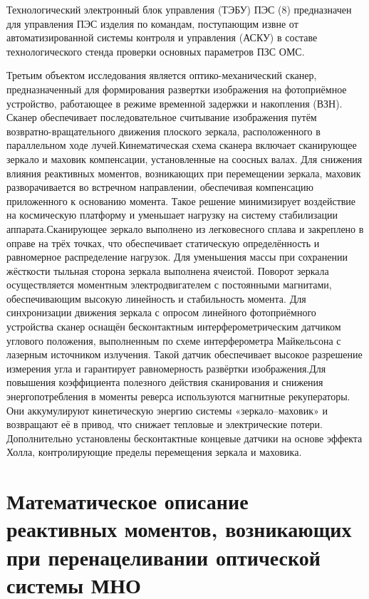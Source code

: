 Технологический электронный блок управления (ТЭБУ) ПЭС (8) предназначен для управления ПЭС изделия по командам, поступающим извне от автоматизированной системы контроля и управления (АСКУ) в составе технологического стенда проверки основных параметров ПЗС ОМС.

Третьим объектом исследования является оптико-механический сканер, предназначенный для формирования развертки изображения на фотоприёмное устройство, работающее в режиме временной задержки и накопления (ВЗН). Сканер обеспечивает последовательное считывание изображения путём возвратно-вращательного движения плоского зеркала, расположенного в параллельном ходе лучей.Кинематическая схема сканера включает сканирующее зеркало и маховик компенсации, установленные на соосных валах. Для снижения влияния реактивных моментов, возникающих при перемещении зеркала, маховик разворачивается во встречном направлении, обеспечивая компенсацию приложенного к основанию момента. Такое решение минимизирует воздействие на космическую платформу и уменьшает нагрузку на систему стабилизации аппарата.Сканирующее зеркало выполнено из легковесного сплава и закреплено в оправе на трёх точках, что обеспечивает статическую определённость и равномерное распределение нагрузок. Для уменьшения массы при сохранении жёсткости тыльная сторона зеркала выполнена ячеистой. Поворот зеркала осуществляется моментным электродвигателем с постоянными магнитами, обеспечивающим высокую линейность и стабильность момента. Для синхронизации движения зеркала с опросом линейного фотоприёмного устройства сканер оснащён бесконтактным интерферометрическим датчиком углового положения, выполненным по схеме интерферометра Майкельсона с лазерным источником излучения. Такой датчик обеспечивает высокое разрешение измерения угла и гарантирует равномерность развёртки изображения.Для повышения коэффициента полезного действия сканирования и снижения энергопотребления в моменты реверса используются магнитные рекуператоры. Они аккумулируют кинетическую энергию системы «зеркало–маховик» и возвращают её в привод, что снижает тепловые и электрические потери. Дополнительно установлены бесконтактные концевые датчики на основе эффекта Холла, контролирующие пределы перемещения зеркала и маховика.


\section{Математическое описание реактивных моментов, возникающих при перенацеливании оптической системы МНО}\label{sec:ch2/sec2}

